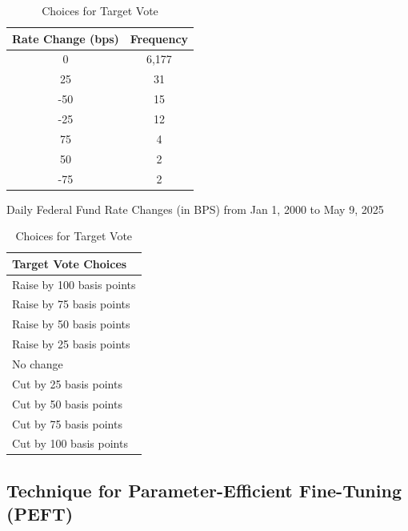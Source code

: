 \begin{table}[htbp]
    \centering
    \footnotesize
    \begin{minipage}[t]{0.48\textwidth}
        \centering
        \begin{tabular}{c c}
            \toprule
            Rate Change (bps) & Frequency \\
            \midrule
            0    & 6,177 \\
            25   & 31 \\
            -50  & 15 \\
            -25  & 12 \\
            75   & 4 \\
            50   & 2 \\
            -75  & 2 \\
            \bottomrule
        \end{tabular}
        \caption{Daily Federal Fund Rate Changes (in BPS) from Jan 1, 2000 to May 9, 2025}
        \label{tab:ch2:ffr_changes}
    \end{minipage}
    \hfill
    \begin{minipage}[t]{0.48\textwidth}
        \centering
        \begin{tabular}{l}
            \toprule
            Target Vote Choices \\
            \midrule
            Raise by 100 basis points \\
            Raise by 75 basis points \\
            Raise by 50 basis points \\
            Raise by 25 basis points \\
            No change \\
            Cut by 25 basis points \\
            Cut by 50 basis points \\
            Cut by 75 basis points \\
            Cut by 100 basis points \\
            \bottomrule
        \end{tabular}
        \caption{Choices for Target Vote}
        \label{tab:ch2:vote_choice}
    \end{minipage}
\end{table}








\subsection*{Technique for Parameter-Efficient Fine-Tuning (PEFT)}


